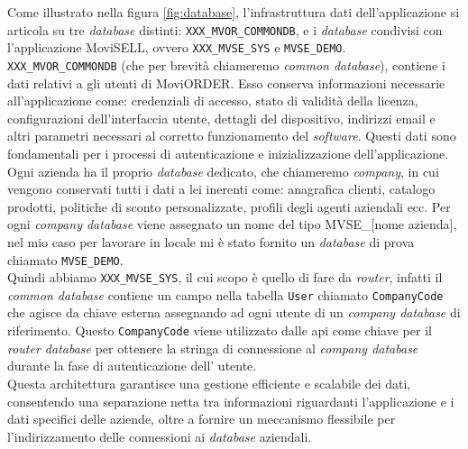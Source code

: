 Come illustrato nella figura \ref{fig:database}, l'infrastruttura dati dell'applicazione {\movi} si articola su tre 
\textit{database} distinti: \texttt{XXX\_MVOR\_COMMONDB}, e i \textit{database} condivisi con l'applicazione 
MoviSELL, ovvero \texttt{XXX\_MVSE\_SYS} e \texttt{MVSE\_DEMO}.\\
\texttt{XXX\_MVOR\_COMMONDB} (che per brevità chiameremo \textit{common database}), contiene i dati relativi a gli utenti di MoviORDER. 
Esso conserva informazioni necessarie all'applicazione come: credenziali di accesso, stato di validità della licenza, 
configurazioni dell'interfaccia utente, dettagli del dispositivo, indirizzi email e altri parametri necessari al corretto 
funzionamento del \textit{software}. Questi dati sono fondamentali per i processi di autenticazione e inizializzazione 
dell'applicazione.\\
Ogni azienda ha il proprio \textit{database} dedicato, che chiameremo \textit{company}, in cui vengono conservati tutti i dati 
a lei inerenti come: anagrafica clienti, catalogo prodotti, politiche di sconto personalizzate, profili degli agenti 
aziendali ecc. Per ogni \textit{company database} viene assegnato un nome del tipo MVSE\_[nome azienda], nel mio caso per lavorare 
in locale mi è stato fornito un \textit{database} di prova chiamato \texttt{MVSE\_DEMO}.\\
Quindi abbiamo \texttt{XXX\_MVSE\_SYS}, il cui scopo è quello di fare da \textit{router}, infatti il \textit{common database} contiene 
un campo nella tabella \texttt{User} chiamato \texttt{CompanyCode} che agisce da chiave esterna assegnando ad ogni utente di {\movi} 
un \textit{company database } di riferimento. Questo \texttt{CompanyCode} viene utilizzato dalle \gls{api} come chiave per il 
\textit{router database} per ottenere la stringa di connessione al \textit{company database} durante la fase di autenticazione dell'
utente.\\
Questa architettura garantisce una gestione efficiente e scalabile dei dati, consentendo una separazione netta tra informazioni 
riguardanti l'applicazione e i dati specifici delle aziende, oltre a fornire un meccanismo flessibile per l'indirizzamento 
delle connessioni ai \textit{database} aziendali.